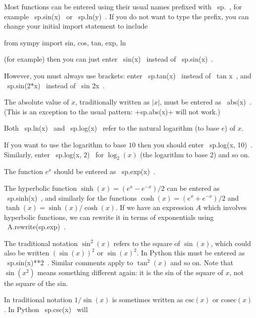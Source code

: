 \documentclass[a4paper,10pt]{amsbook}
\begin{document}
\begin{secenum}
%
 \item\label{standard} Most functions can be entered using their
  usual names prefixed with \pcode~sp.~, for example
 \pcode~sp.sin(x)~ or \pcode~sp.ln(y)~.  If you do not want to type
 the prefix, you can change your initial import statement to include 
 \begin{pcodeblock}
  from sympy import sin, cos, tan, exp, ln
 \end{pcodeblock}
 (for example) then you can just enter \pcode~sin(x)~ instead of
 \pcode~sp.sin(x)~. 
%
 \item\label{funcbrackets}
  However, you must always use brackets: enter
  \pcode~sp.tan(x)~ instead of \pcode~tan x~, and \pcode~sp.sin(2*x)~
  instead of \pcode~sin 2x~. 
%
 \item\label{abs} The absolute value of $x$, traditionally written as
  $|x|$, must be entered as \pcode~abs(x)~.  (This is an exception to
  the usual pattern: \pcode+sp.abs(x)+ will not work.)
%
 \item\label{log} Both \pcode~sp.ln(x)~ and \pcode~sp.log(x)~ refer to the natural
  logarithm (to base $e$) of $x$. 
%
 \item\label{logbase}
  If you want to use the logarithm to base $10$ then you
  should enter \pcode~sp.log(x, 10)~.  Similarly, enter
  \pcode~sp.log(x, 2)~ for $\log_2(x)$ (the logarithm to base $2$) and so on. 
%
 \item\label{expx} The function $e^x$ should be entered as \pcode~sp.exp(x)~. 
%
 \item\label{hyp} The hyperbolic function $\sinh(x)=(e^x-e^{-x})/2$ can be
  entered as \pcode~sp.sinh(x)~, and similarly for the functions
  $\cosh(x)=(e^x+e^{-x})/2$ and $\tanh(x)=\sinh(x)/\cosh(x)$.
  If we have an expression $A$ which involves hyperbolic functions, we
  can rewrite it in terms of exponentials using
  \pcode~A.rewrite(sp.exp)~. 
%
 \item\label{sinsquared} The traditional notation $\sin^2(x)$
  refers to the square of $\sin(x)$, which could also be
  written $(\sin(x))^2$ or $\sin(x)^2$.  In Python this must 
  be entered as \pcode~sp.sin(x)**2~.  Similar comments apply to
  $\tan^2(x)$ and so on.  Note that $\sin(x^2)$ means something
  different again: it is the sin of the square of $x$, not the square
  of the sin. 
%
 \item\label{cosec} In traditional notation $1/\sin(x)$ is sometimes written as
  $\text{csc}(x)$ or $\text{cosec}(x)$.  In Python \pcode~sp.csc(x)~ will

\end{secenum}
\end{document}
